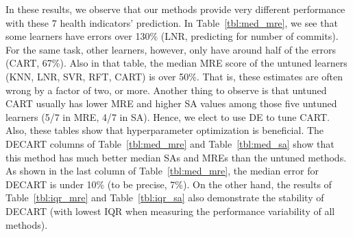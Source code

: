 \documentclass[sigconf,anonymous,review]{acmart}
\begin{document}
In these results, we observe that our methods provide very different performance with these 7 health indicators' prediction. In Table~\ref{tbl:med_mre}, we see that some learners have errors over 130\% (LNR, predicting for number of commits). For the same task, other learners, however, only have around half of the errors (CART, 67\%).
Also in that   table, the median MRE score of the untuned learners (KNN, LNR, SVR, RFT, CART) is over 50\%. That is,  these estimates are often wrong by a factor of two, or more.
Another thing to observe is that untuned CART usually has lower MRE and higher SA values among those five untuned learners (5/7 in MRE, 4/7 in SA). Hence, we elect to use DE to tune CART. 
Also, these tables show that   hyperparameter optimization is   beneficial.
The  DECART columns of Table~\ref{tbl:med_mre} and Table~\ref{tbl:med_sa} show that this method has much better median SAs and MREs than the untuned methods. As shown in the last column of Table~\ref{tbl:med_mre}, the median error for DECART is under 10\% (to be precise, 7\%). On the other hand, the results of Table~\ref{tbl:iqr_mre} and Table~\ref{tbl:iqr_sa} also demonstrate the stability of DECART (with lowest IQR when measuring the performance variability of all methods).

\end{document}
